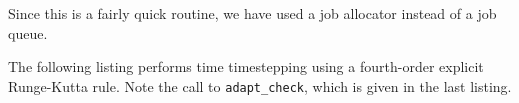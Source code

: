 Since this is a fairly quick routine, we have used a job allocator instead of a job queue.



The following listing performs time timestepping using a fourth-order explicit Runge-Kutta rule. Note the call
to {\tt adapt\_check}, which is given in the last listing.



